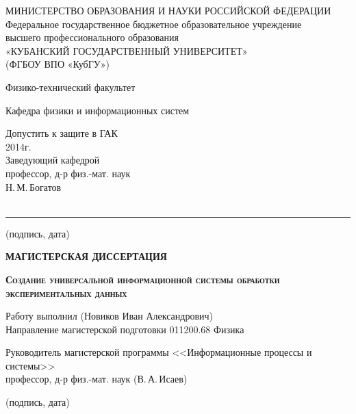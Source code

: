 \documentclass[a4paper, 14pt, titlepage]{extarticle}
\author{\theauthor, кафедра физики и информационных систем КубГУ}
\title{\thetitle}
\newcommand{\thetitle}{Создание универсальной информационной системы обработки экспериментальных данных}
\begin{document}

  \thispagestyle{empty}
  \begin {center}
  \small{МИНИСТЕРСТВО ОБРАЗОВАНИЯ И НАУКИ РОССИЙСКОЙ ФЕДЕРАЦИИ}\\
  Федеральное государственное бюджетное образовательное учреждение\\
  высшего профессионального образования\\
  «КУБАНСКИЙ ГОСУДАРСТВЕННЫЙ УНИВЕРСИТЕТ»\\
  (ФГБОУ ВПО «КубГУ»)

  Физико-технический факультет

  \vspace {1cm}

  Кафедра физики и информационных систем

  \vspace {1cm}

  \hfill
  \begin{minipage}{7cm}
    \begin{flushleft}
      Допустить к защите в ГАК\\
      \hspace*{0mm}\hrulefill{} 2014г.\\
      Заведующий кафедрой\\
      профессор, д-р физ.-мат. наук\\
      Н.\,М.\,Богатов \hrulefill{}\\
      ~\hrule
      {\footnotesize\centering (подпись, дата)\par}
    \end{flushleft}
  \end{minipage}

  \vspace {1.5cm}

  \textbf{МАГИСТЕРСКАЯ ДИССЕРТАЦИЯ}

  \vspace {0.5cm}

  \textbf{ \large \scshape \thetitle }

  \vspace {1.5cm}

  \begin{flushleft}
    Работу выполнил \hrulefill{}  (Новиков Иван Александрович)\\
    Направление магистерской подготовки 011200.68 Физика

    Руководитель магистерской программы <<Информационные процессы и системы>>\\
    профессор, д-р физ.-мат. наук \hrulefill{} (В.\,А.\,Исаев)
    \\[-3mm]{\footnotesize\centering (подпись, дата)\par}


\end{flushleft}
\end{center}
\end{document}
